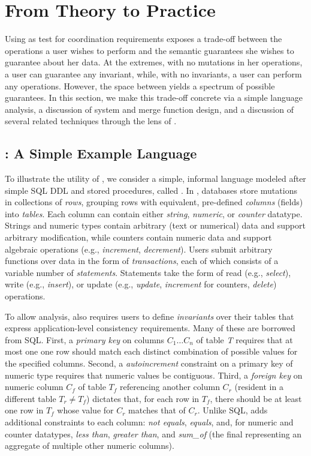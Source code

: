
\section{From Theory to Practice}
\label{sec:bcc-practice}

Using \iconfluence as test for coordination requirements exposes a
trade-off between the operations a user wishes to perform and the
semantic guarantees she wishes to guarantee about her data. At the
extremes, with no mutations in her operations, a user can guarantee
any invariant, while, with no invariants, a user can perform any
operations. However, the space between yields a spectrum of possible
\iconfluent guarantees. In this section, we make this trade-off
concrete via a simple language analysis, a discussion of system and
merge function design, and a discussion of several related techniques
through the lens of \iconfluence.

\subsection{\lang: A Simple Example Language}

To illustrate the utility of \iconfluence, we consider a simple,
informal language modeled after simple SQL DDL and stored procedures,
called \lang. In \lang, databases store mutations in collections of
\textit{rows}, grouping rows with equivalent, pre-defined
\textit{columns} (fields) into \textit{tables}. Each column can
contain either \textit{string}, \textit{numeric}, or \textit{counter}
datatype. Strings and numeric types contain arbitrary (text or
numerical) data and support arbitrary modification, while counters
contain numeric data and support algebraic operations (e.g.,
\textit{increment}, \textit{decrement}). Users submit arbitrary
functions over data in the form of \textit{transactions}, each of
which consists of a variable number of \textit{statements}. Statements
take the form of read (e.g., \textit{select}), write (e.g.,
\textit{insert}), or update (e.g., \textit{update}, \textit{increment}
for counters, \textit{delete}) operations.

To allow \cfreedom analysis, \lang also requires users to define
\textit{invariants} over their tables that express application-level
consistency requirements. Many of these are borrowed from SQL. First,
a \textit{primary key} on columns $C_1 \dots C_n$ of table \textit{T}
requires that at most one one row should match each distinct
combination of possible values for the specified columns. Second, a
\textit{autoincrement} constraint on a primary key of numeric type
requires that numeric values be contiguous. Third, a \textit{foreign
  key} on numeric column $C_f$ of table $T_f$ referencing another
column $C_r$ (resident in a different table $T_r \neq T_f$) dictates
that, for each row in $T_f$, there should be at least one row in $T_f$
whose value for $C_r$ matches that of $C_r$. Unlike SQL, \lang adds
additional constraints to each column: \textit{not equals},
\textit{equals}, and, for numeric and counter datatypes, \textit{less
  than}, \textit{greater than}, and \textit{sum\_of} (the final
representing an aggregate of multiple other numeric columns).


